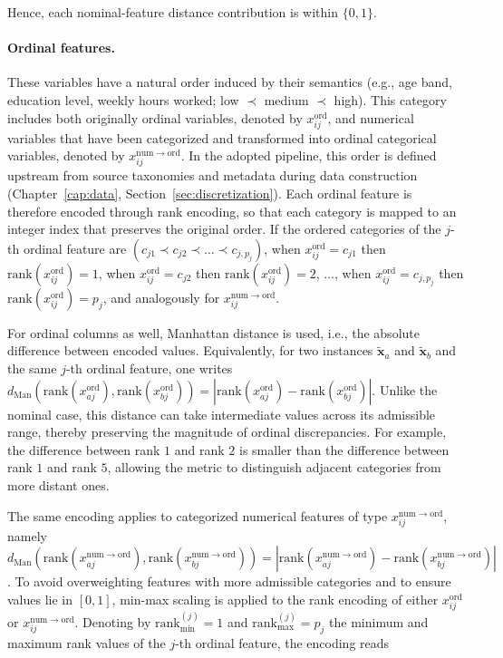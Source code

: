 Hence, each nominal-feature distance contribution is within $\{0,1\}$.

\paragraph{Ordinal features.} These variables have a natural order induced by their semantics (e.g., age band, education level, weekly hours worked; low $\prec$ medium $\prec$ high). This category includes both originally ordinal variables, denoted by $x^{\mathrm{ord}}_{ij}$, and numerical variables that have been categorized and transformed into ordinal categorical variables, denoted by $x^{\mathrm{num \rightarrow ord}}_{ij}$. In the adopted pipeline, this order is defined upstream from source taxonomies and metadata during data construction (Chapter~\ref{cap:data}, Section~\ref{sec:discretization}). Each ordinal feature is therefore encoded through rank encoding, so that each category is mapped to an integer index that preserves the original order. If the ordered categories of the $j$-th ordinal feature are $(c_{j1} \prec c_{j2} \prec \dots \prec c_{j,p_j})$, when $x^{\mathrm{ord}}_{ij} = c_{j1}$ then $\mathrm{rank}(x^{\mathrm{ord}}_{ij}) = 1$, when $x^{\mathrm{ord}}_{ij} = c_{j2}$ then $\mathrm{rank}(x^{\mathrm{ord}}_{ij}) = 2$, $\dots$, when $x^{\mathrm{ord}}_{ij} = c_{j,p_j}$ then $\mathrm{rank}(x^{\mathrm{ord}}_{ij}) = p_j$, and analogously for $x^{\mathrm{num \rightarrow ord}}_{ij}$.

For ordinal columns as well, Manhattan distance is used, i.e., the absolute difference between encoded values. Equivalently, for two instances $\tilde{\mathbf{x}}_a$ and $\tilde{\mathbf{x}}_b$ and the same $j$-th ordinal feature, one writes $d_{\mathrm{Man}}\!\left(\mathrm{rank}(x^{\mathrm{ord}}_{aj}),\mathrm{rank}(x^{\mathrm{ord}}_{bj})\right) = \left|\mathrm{rank}(x^{\mathrm{ord}}_{aj})-\mathrm{rank}(x^{\mathrm{ord}}_{bj})\right|$. Unlike the nominal case, this distance can take intermediate values across its admissible range, thereby preserving the magnitude of ordinal discrepancies. For example, the difference between rank $1$ and rank $2$ is smaller than the difference between rank $1$ and rank $5$, allowing the metric to distinguish adjacent categories from more distant ones.

The same encoding applies to categorized numerical features of type $x^{\mathrm{num \rightarrow ord}}_{ij}$, namely $d_{\mathrm{Man}}\!\left(\mathrm{rank}(x^{\mathrm{num \rightarrow ord}}_{aj}),\mathrm{rank}(x^{\mathrm{num \rightarrow ord}}_{bj})\right) = \left|\mathrm{rank}(x^{\mathrm{num \rightarrow ord}}_{aj})-\mathrm{rank}(x^{\mathrm{num \rightarrow ord}}_{bj})\right|$. To avoid overweighting features with more admissible categories and to ensure values lie in $[0,1]$, min-max scaling is applied to the rank encoding of either $x^{\mathrm{ord}}_{ij}$ or $x^{\mathrm{num \rightarrow ord}}_{ij}$. Denoting by $\mathrm{rank}_{\min}^{(j)}=1$ and $\mathrm{rank}_{\max}^{(j)}=p_j$ the minimum and maximum rank values of the $j$-th ordinal feature, the encoding reads

